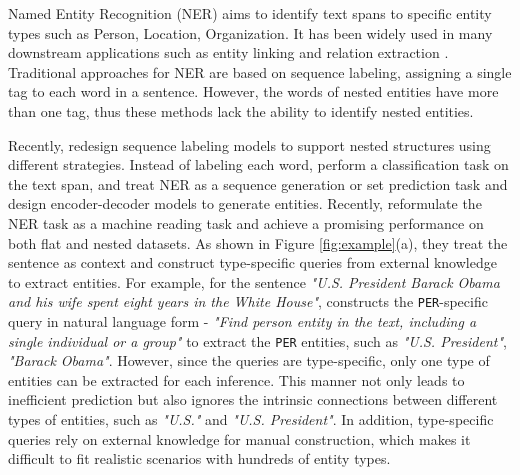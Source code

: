 \documentclass[11pt]{article}
\begin{document}
Named Entity Recognition (NER) aims to identify text spans to specific entity types such as Person, Location, Organization. It has been widely used in many downstream applications such as entity linking \citep{ganea-hofmann-2017-deep, le-titov-2018-improving} and relation extraction \citep{li-ji-2014-incremental, miwa-bansal-2016-end, 10.1145/3442381.3449895}.
Traditional approaches for NER are based on sequence labeling, assigning a single tag to each word in a sentence. However, the words of nested entities have more than one tag, thus these methods lack the ability to identify nested entities.

Recently,
\citet{ ju-etal-2018-neural, strakova-etal-2019-neural, wang-etal-2020-pyramid} redesign sequence labeling models to support nested structures using different strategies.
Instead of labeling each word, \citet{luan-etal-2019-general, Tan_Qiu_Chen_Wang_Huang_2020, li-etal-2021-span, shen2021locateandlabel} perform a classification task on the text span,
and \citet{strakova-etal-2019-neural, tanl, yan2021bartner, tan2021sequencetoset} treat NER as a sequence generation or set prediction task and design encoder-decoder models to generate entities. 
Recently, 
\citet{li-etal-2020-unified, mengge-etal-2020-coarse,9463309} reformulate the NER task as a machine reading task and achieve a promising performance on both flat and nested datasets. As shown in Figure \ref{fig:example}(a), they treat the sentence as context and construct type-specific queries from external knowledge to extract entities. For example, for the sentence \textit{"U.S. President Barack Obama and his wife spent eight years in the White House"}, \citet{li-etal-2020-unified} constructs the \texttt{PER}-specific query in natural language form - \textit{"Find person entity in the text, including a single individual or a group"} to extract the \texttt{PER} entities, such as \textit{"U.S. President"}, \textit{"Barack Obama"}.
However, since the queries are type-specific, only one type of entities can be extracted for each inference.
This manner not only leads to inefficient prediction but also ignores the intrinsic connections between different types of entities, such as \textit{"U.S."} and \textit{"U.S. President"}.
In addition, type-specific queries rely on external knowledge for manual construction, which makes it difficult to fit realistic scenarios with hundreds of entity types.
\end{document}
